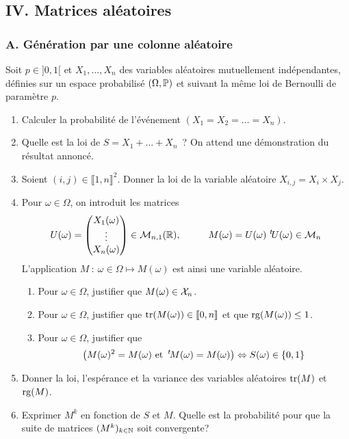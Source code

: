 \subsection*{IV. Matrices aléatoires}
\subsubsection*{A. G\'en\'eration par une colonne al\'eatoire}
Soit $p\in ]0,1[$ et $X_1,\dots,X_n$ des variables al\'eatoires mutuellement ind\'ependantes, d\'efinies sur un espace probabilis\'e $(\Omega,\mathbb{P})$ et suivant la m\^eme loi de Bernoulli de param\`etre $p$.
\begin{enumerate}
\item Calculer la probabilit\'e de l'événement $\left( X_1=X_2=\dots=X_n\right) $.
\item Quelle est la loi de $S=X_1+\dots+X_n$~? On attend une d\'emonstration du r\'esultat annonc\'e.
\item Soient $(i,j)\in \llbracket 1,n\rrbracket^2$. Donner la loi de la variable al\'eatoire $X_{i,j}=X_i\times X_j$.
\item Pour $\omega\in \Omega$, on introduit les matrices 
\begin{displaymath}
U(\omega)=
\begin{pmatrix}
X_1(\omega) \\ \vdots\\ X_n(\omega)  
\end{pmatrix} \in \mathcal{M}_{n,1}(\mathbb{R}), \hspace{1cm} 
M(\omega)=U(\omega)\, \,\mathstrut^t\! {U(\omega)} \in \mathcal{M}_n
\end{displaymath}
L'application $M\ :\ \omega \in \Omega \mapsto M(\omega)$ est ainsi une variable al\'eatoire.
\begin{enumerate}
\item Pour $\omega\in \Omega$, justifier que $M(\omega)\in {\cal X}_n$.
\item Pour $\omega\in \Omega$, justifier que $\operatorname{tr}(M(\omega))\in \llbracket 0,n\rrbracket $ et que ${\rm rg}(M(\omega))\leq 1$.
\item Pour $\omega\in \Omega$, justifier que 
\begin{displaymath}
\left( M(\omega)^2 = M(\omega) \text{ et } \,\mathstrut^t\! M(\omega) = M(\omega)\right)\Leftrightarrow  S(\omega)\in \{0,1\}
\end{displaymath}
\end{enumerate}

\item Donner la loi, l'esp\'erance et la variance des variables al\'eatoires $\operatorname{tr}(M)$ et ${\rm rg}(M)$.
\item Exprimer $M^k$ en fonction de $S$ et $M$. Quelle est la probabilit\'e pour que la suite de matrices $(M^k)_{k\in \mathbb{N}}$ soit convergente?
\end{enumerate}

